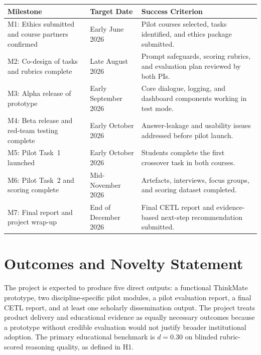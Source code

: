 \documentclass[11pt,a4paper]{article}
\begin{document}
\begin{tabularx}{\textwidth}{|L{4.2cm}|L{2.2cm}|X|}
\hline
{}
\textbf{Milestone} & \textbf{Target Date} & \textbf{Success Criterion} \\ \hline
M1: Ethics submitted and course partners confirmed & Early June 2026 & Pilot courses selected, tasks identified, and ethics package submitted. \\ \hline
M2: Co-design of tasks and rubrics complete & Late August 2026 & Prompt safeguards, scoring rubrics, and evaluation plan reviewed by both PIs. \\ \hline
M3: Alpha release of prototype & Early September 2026 & Core dialogue, logging, and dashboard components working in test mode. \\ \hline
M4: Beta release and red-team testing complete & Early October 2026 & Answer-leakage and usability issues addressed before pilot launch. \\ \hline
M5: Pilot Task~1 launched & Early October 2026 & Students complete the first crossover task in both courses. \\ \hline
M6: Pilot Task~2 and scoring complete & Mid-November 2026 & Artefacts, interviews, focus groups, and scoring dataset completed. \\ \hline
M7: Final report and project wrap-up & End of December 2026 & Final CETL report and evidence-based next-step recommendation submitted. \\ \hline
\end{tabularx}

\section{Outcomes and Novelty Statement}

The project is expected to produce five direct outputs: a functional ThinkMate prototype, two discipline-specific pilot modules, a pilot evaluation report, a final CETL report, and at least one scholarly dissemination output. The project treats product delivery and educational evidence as equally necessary outcomes because a prototype without credible evaluation would not justify broader institutional adoption. The primary educational benchmark is $d = 0.30$ on blinded rubric-scored reasoning quality, as defined in H1.
\end{document}
